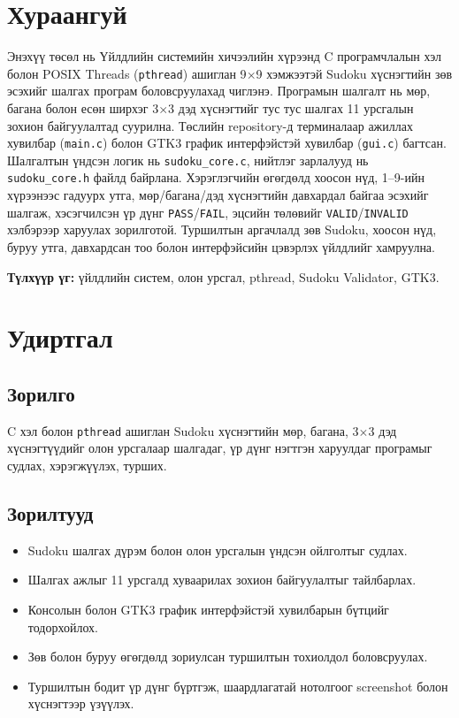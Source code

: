 \documentclass[12pt,a4paper]{report}
\begin{document}
	\chapter*{Хураангуй}
	
	Энэхүү төсөл нь Үйлдлийн системийн хичээлийн хүрээнд C програмчлалын хэл болон POSIX Threads (\texttt{pthread}) ашиглан 9$\times$9 хэмжээтэй Sudoku хүснэгтийн зөв эсэхийг шалгах програм боловсруулахад чиглэнэ. Програмын шалгалт нь мөр, багана болон есөн ширхэг 3$\times$3 дэд хүснэгтийг тус тус шалгах 11 урсгалын зохион байгуулалтад суурилна. Төслийн repository-д терминалаар ажиллах хувилбар (\texttt{main.c}) болон GTK3 график интерфэйстэй хувилбар (\texttt{gui.c}) багтсан. Шалгалтын үндсэн логик нь \texttt{sudoku\_core.c}, нийтлэг зарлалууд нь \texttt{sudoku\_core.h} файлд байрлана. Хэрэглэгчийн өгөгдөлд хоосон нүд, 1--9-ийн хүрээнээс гадуурх утга, мөр/багана/дэд хүснэгтийн давхардал байгаа эсэхийг шалгаж, хэсэгчилсэн үр дүнг \texttt{PASS}/\texttt{FAIL}, эцсийн төлөвийг \texttt{VALID}/\texttt{INVALID} хэлбэрээр харуулах зорилготой. Туршилтын аргачлалд зөв Sudoku, хоосон нүд, буруу утга, давхардсан тоо болон интерфэйсийн цэвэрлэх үйлдлийг хамруулна. 
	
	\noindent\textbf{Түлхүүр үг:} үйлдлийн систем, олон урсгал, pthread, Sudoku Validator, GTK3.
	
	\tableofcontents
	\clearpage
	
	\chapter{Удиртгал}
	\section{Зорилго}
	C хэл болон \texttt{pthread} ашиглан Sudoku хүснэгтийн мөр, багана, 3$\times$3 дэд хүснэгтүүдийг олон урсгалаар шалгадаг, үр дүнг нэгтгэн харуулдаг програмыг судлах, хэрэгжүүлэх, турших.
	
	\section{Зорилтууд}
	\begin{itemize}
		\item Sudoku шалгах дүрэм болон олон урсгалын үндсэн ойлголтыг судлах.
		\item Шалгах ажлыг 11 урсгалд хуваарилах зохион байгуулалтыг тайлбарлах.
		\item Консолын болон GTK3 график интерфэйстэй хувилбарын бүтцийг тодорхойлох.
		\item Зөв болон буруу өгөгдөлд зориулсан туршилтын тохиолдол боловсруулах.
		\item Туршилтын бодит үр дүнг бүртгэж, шаардлагатай нотолгоог screenshot болон хүснэгтээр үзүүлэх.
	\end{itemize}
	
\end{document}
